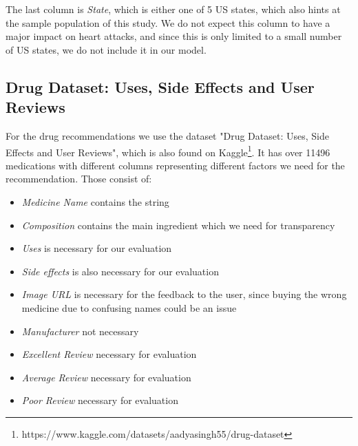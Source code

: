 \documentclass{article}
\begin{document}
The last column is \textit{State}, which is either one of 5 US states,
which also hints at the sample population of this study.
We do not expect this column to have a major impact on heart attacks,
and since this is only limited to a small number of US states, we do not include it in our model.



\subsection{Drug Dataset: Uses, Side Effects and User Reviews}
For the drug recommendations we use the dataset "Drug Dataset: Uses, Side Effects and User Reviews", which is also found on Kaggle\footnote{https://www.kaggle.com/datasets/aadyasingh55/drug-dataset}. It has over 11496 medications with different columns representing different factors we need for the recommendation. Those consist of:

\begin{itemize}
    \item \textit{Medicine Name} contains the string
    \item \textit{Composition} contains the main ingredient which we need for transparency
    \item \textit{Uses} is necessary for our evaluation
    \item \textit{Side effects} is also necessary for our evaluation
    \item \textit{Image URL} is necessary for the feedback to the user, since buying the wrong medicine due to confusing names could be an issue
    \item \textit{Manufacturer} not necessary
    \item \textit{Excellent Review} necessary for evaluation
    \item \textit{Average Review} necessary for evaluation
    \item \textit{Poor Review} necessary for evaluation
\end{itemize}
\end{document}
